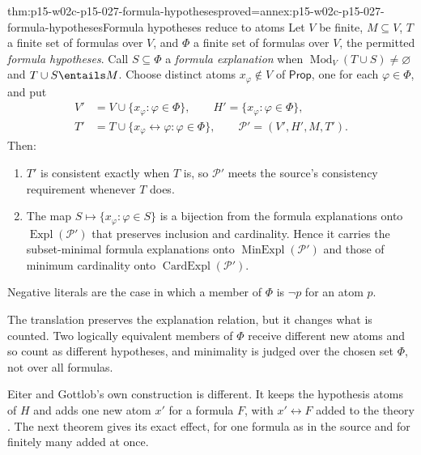 \begin{hbtheorem}{thm:p15-w02c-p15-027-formula-hypotheses}{proved=annex:p15-w02c-p15-027-formula-hypotheses}{Formula hypotheses reduce to atoms}
Let \(V\) be finite, \(M\subseteq V\), \(T\) a finite set of formulas over
\(V\), and \(\Phi\) a finite set of formulas over \(V\), the permitted
\emph{formula hypotheses}. Call \(S\subseteq\Phi\) a \emph{formula
explanation} when \(\operatorname{Mod}_V(T\cup S)\ne\varnothing\) and
\(T\cup S\entails M\). Choose distinct atoms \(x_\varphi\notin V\) of
\(\mathsf{Prop}\), one for each \(\varphi\in\Phi\), and put
\[
\begin{aligned}
 V'&=V\cup\{x_\varphi:\varphi\in\Phi\},\qquad
 H'=\{x_\varphi:\varphi\in\Phi\},\\
 T'&=T\cup\{x_\varphi\leftrightarrow\varphi:\varphi\in\Phi\},\qquad
 \mathcal P'=(V',H',M,T').
\end{aligned}
\]
Then:
\begin{enumerate}
\item \(T'\) is consistent exactly when \(T\) is, so \(\mathcal P'\)
      meets the source's consistency requirement whenever \(T\) does.
\item The map \(S\mapsto\{x_\varphi:\varphi\in S\}\) is a bijection
      from the formula explanations onto \(\operatorname{Expl}(\mathcal P')\)
      that preserves inclusion and cardinality. Hence it carries the
      subset-minimal formula explanations onto
      \(\operatorname{MinExpl}(\mathcal P')\) and those of minimum
      cardinality onto \(\operatorname{CardExpl}(\mathcal P')\).
\end{enumerate}
Negative literals are the case in which a member of \(\Phi\) is
\(\neg p\) for an atom \(p\).
\end{hbtheorem}

The translation preserves the explanation relation, but it changes
what is counted. Two logically equivalent members of \(\Phi\) receive different
new atoms and so count as different hypotheses, and minimality is judged
over the chosen set \(\Phi\), not over all formulas.

Eiter and Gottlob's own construction is different. It keeps the
hypothesis atoms of \(H\) and adds one new atom \(x'\) for a formula
\(F\), with \(x'\leftrightarrow F\) added to the theory
\cite[manuscript p.~10]{EiterGottlobAbductionManuscript}. The next theorem
gives its exact effect, for one formula as in the source and for finitely
many added at once.

